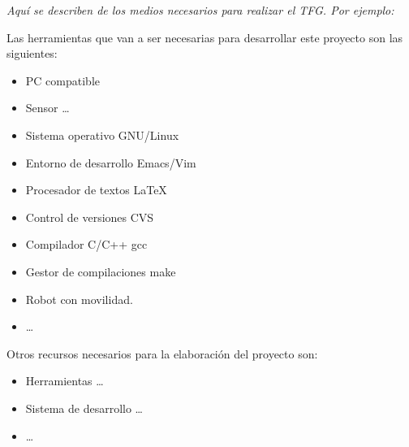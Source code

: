 \textit{Aquí se describen de los medios necesarios para realizar el TFG. Por
  ejemplo:}

Las herramientas que van a ser necesarias para desarrollar este proyecto
son las siguientes:

\begin{itemize}
\item PC compatible
\item Sensor  \ldots
\item Sistema operativo GNU/Linux~\cite{gnulinux}
\item Entorno de desarrollo Emacs/Vim~\cite{emacs}
\item Procesador de textos \LaTeX~\cite{lamport94}
\item Control de versiones CVS~\cite{cvs}
\item Compilador C/C++ gcc~\cite{gcc}
\item Gestor de compilaciones make~\cite{make}
\item Robot con movilidad.
\item  \ldots
\end{itemize}



Otros recursos necesarios para la elaboración del proyecto son:

\begin{itemize}
\item Herramientas  \ldots
\item Sistema de desarrollo  \ldots
\item  \ldots
\end{itemize}




% 







